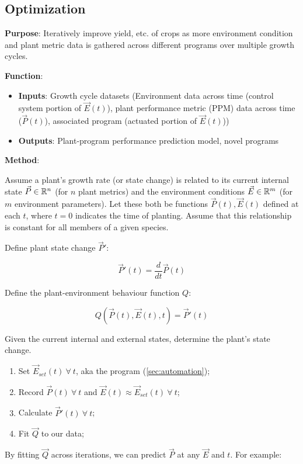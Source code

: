 \subsection{Optimization}
\label{sec:optimization}

\textbf{Purpose}: Iteratively improve yield, etc. of crops as more environment condition and plant metric data is gathered across different programs over multiple growth cycles.

\textbf{Function}:
\begin{itemize}
    \item \textbf{Inputs}: Growth cycle datasets (Environment data across time (control system portion of $\vec E(t)$), plant performance metric (PPM) data across time ($\vec P(t)$), associated program (actuated portion of $\vec E(t)$))
    \item \textbf{Outputs}: Plant-program performance prediction model, novel programs
\end{itemize}

\textbf{Method}: 

Assume a plant's growth rate (or state change) is related to its current internal state $\vec P \in \mathbb R^n$ (for $n$ plant metrics) and the environment conditions $\vec E \in \mathbb R^m$ (for $m$ environment parameters). Let these both be functions $\vec P (t),\vec E(t)$ defined at each $t$, where $t=0$ indicates the time of planting. Assume that this relationship is constant for all members of a given species.

Define plant state change $\vec P'$: 

$$\vec P'(t) = \frac{d}{dt}\vec P(t)$$

Define the plant-environment behaviour function $Q$: 

$$Q(\vec P(t), \vec E(t), t)=\vec P'(t)$$ 

Given the current internal and external states, determine the plant's state change.

\begin{enumerate}
    \item Set $\vec E_{set}(t)~\forall~ t$, aka the program (\ref{sec:automation});
    \item Record $\vec P(t)~\forall~ t$ and $\vec E(t)\approx \vec E_{set}(t)~\forall~ t$;
    \item Calculate $\vec P'(t)~\forall~ t$;
    \item Fit $\vec Q$ to our data;
\end{enumerate}

By fitting $\vec Q$ across iterations, we can predict $\vec P$ at any $\vec E$ and $t$. For example:

